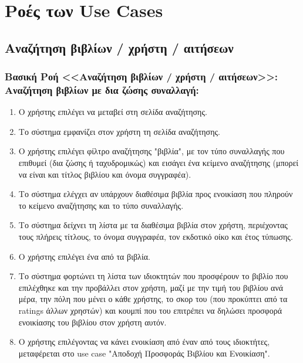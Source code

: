 \documentclass[12pt,a4paper]{article}
\begin{document}
\section{Ροές των Use Cases}
\label{Ροές των Use Cases}

\subsection{Αναζήτηση βιβλίων / χρήστη / αιτήσεων}

\subsubsection*{Βασική Ροή <<Αναζήτηση βιβλίων / χρήστη / αιτήσεων>>: Αναζήτηση βιβλίων με δια ζώσης συναλλαγή:}
\begin{enumerate}
    \item Ο χρήστης επιλέγει να μεταβεί στη σελίδα αναζήτησης.
    \item Το σύστημα εμφανίζει στον χρήστη τη σελίδα αναζήτησης.
    \item Ο χρήστης επιλέγει φίλτρο αναζήτησης "βιβλία", με τον τύπο συναλλαγής που επιθυμεί (δια ζώσης ή ταχυδρομικώς) και εισάγει ένα κείμενο αναζήτησης (μπορεί να είναι και τίτλος βιβλίου και όνομα συγγραφέα).
        \label{Επιλογή τύπου αναζήτησης}
    \item Το σύστημα ελέγχει αν υπάρχουν διαθέσιμα βιβλία προς ενοικίαση που πληρούν το κείμενο αναζήτησης και το τύπο συναλλαγής.
        \label{Ύπαρξη βιβλίου}
    \item Το σύστημα δείχνει τη λίστα με τα διαθέσιμα βιβλία στον χρήστη, περιέχοντας τους πλήρεις τίτλους, το όνομα συγγραφέα, τον εκδοτικό οίκο και έτος τύπωσης.
    \item Ο χρήστης επιλέγει ένα από τα βιβλία.
    \item Το σύστημα φορτώνει τη λίστα των ιδιοκτητών που προσφέρουν το βιβλίο που επιλέχθηκε και την προβάλλει στον χρήστη, μαζί με την τιμή του βιβλίου ανά μέρα, την πόλη που μένει ο κάθε χρήστης, το σκορ του (που προκύπτει από τα ratings άλλων χρηστών) και κουμπί που του επιτρέπει να δηλώσει προσφορά ενοικίασης του βιβλίου στον χρήστη αυτόν.
    \item Ο χρήστης επιλέγοντας να κάνει ενοικίαση από έναν από τους ιδιοκτήτες, μεταφέρεται στο use case "Αποδοχή Προσφοράς Βιβλίου και Ενοικίαση".
\end{enumerate}
\end{document}
